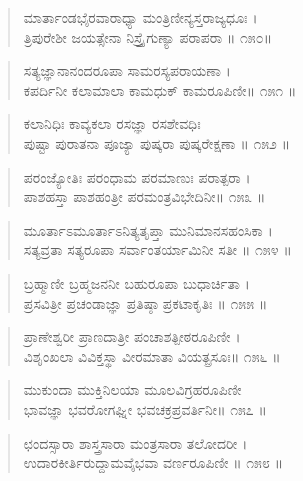 \begin{verse}
ಮಾರ್ತಾಂಡಭೈರವಾರಾಧ್ಯಾ ಮಂತ್ರಿಣೀನ್ಯಸ್ತರಾಜ್ಯಧೂಃ ।\\ತ್ರಿಪುರೇಶೀ ಜಯತ್ಸೇನಾ ನಿಸ್ತ್ರೈಗುಣ್ಯಾ ಪರಾಪರಾ \num{॥ ೧೫೦॥}
\end{verse}

\begin{verse}
ಸತ್ಯಜ್ಞಾನಾನಂದರೂಪಾ ಸಾಮರಸ್ಯಪರಾಯಣಾ ।\\ಕಪರ್ದಿನೀ ಕಲಾಮಾಲಾ ಕಾಮಧುಕ್ ಕಾಮರೂಪಿಣೀ\num{॥ ೧೫೧ ॥}
\end{verse}

\begin{verse}
ಕಲಾನಿಧಿಃ ಕಾವ್ಯಕಲಾ ರಸಜ್ಞಾ ರಸಶೇವಧಿಃ \\ಪುಷ್ಟಾ ಪುರಾತನಾ ಪೂಜ್ಯಾ ಪುಷ್ಕರಾ ಪುಷ್ಕರೇಕ್ಷಣಾ \num{॥ ೧೫೨ ॥}
\end{verse}

\begin{verse}
ಪರಂಜ್ಯೋತಿಃ ಪರಂಧಾಮ ಪರಮಾಣುಃ ಪರಾತ್ಪರಾ ।\\ಪಾಶಹಸ್ತಾ  ಪಾಶಹಂತ್ರೀ ಪರಮಂತ್ರವಿಭೇದಿನೀ\num{॥ ೧೫೩ ॥}
\end{verse}

\begin{verse}
ಮೂರ್ತಾಽಮೂರ್ತಾಽನಿತ್ಯತೃಪ್ತಾ ಮುನಿಮಾನಸಹಂಸಿಕಾ ।\\ಸತ್ಯವ್ರತಾ ಸತ್ಯರೂಪಾ ಸರ್ವಾಂತರ್ಯಾಮಿನೀ ಸತೀ \num{॥ ೧೫೪ ॥}
\end{verse}

\begin{verse}
ಬ್ರಹ್ಮಾಣೀ ಬ್ರಹ್ಮಜನನೀ ಬಹುರೂಪಾ ಬುಧಾರ್ಚಿತಾ ।\\ಪ್ರಸವಿತ್ರೀ ಪ್ರಚಂಡಾಜ್ಞಾ ಪ್ರತಿಷ್ಠಾ ಪ್ರಕಟಾಕೃತಿಃ \num{॥ ೧೫೫ ॥}
\end{verse}

\begin{verse}
ಪ್ರಾಣೇಶ್ವರೀ ಪ್ರಾಣದಾತ್ರೀ ಪಂಚಾಶತ್ಪೀಠರೂಪಿಣೀ ।\\ವಿಶೃಂಖಲಾ ವಿವಿಕ್ತಸ್ಥಾ ವೀರಮಾತಾ ವಿಯತ್ಪ್ರಸೂಃ\num{॥ ೧೫೬ ॥}
\end{verse}

\begin{verse}
ಮುಕುಂದಾ ಮುಕ್ತಿನಿಲಯಾ ಮೂಲವಿಗ್ರಹರೂಪಿಣೀ \\ಭಾವಜ್ಞಾ ಭವರೋಗಘ್ನೀ ಭವಚಕ್ರಪ್ರವರ್ತಿನೀ\num{॥ ೧೫೭ ॥}
\end{verse}

\begin{verse}
ಛಂದಸ್ಸಾರಾ ಶಾಸ್ತ್ರಸಾರಾ ಮಂತ್ರಸಾರಾ ತಲೋದರೀ ।\\ಉದಾರಕೀರ್ತಿರುದ್ದಾಮವೈಭವಾ ವರ್ಣರೂಪಿಣೀ \num{॥ ೧೫೮ ॥}
\end{verse}


